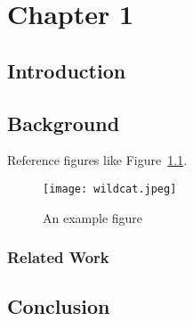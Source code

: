 
\chapter{Chapter 1} \label{chapter-1}

\section{Introduction}
\blindtext

\section{Background} \label{ch1-sec:background}
\blindtext

Reference figures like Figure~\ref{fig:wildcat}.
\begin{figure}%
	\centering
	\texttt{[image: wildcat.jpeg]} 
	\caption{An example figure} 
	\label{fig:wildcat} 
\end{figure}

\subsection{Related Work} \label{ch1-subsec:related-work}
\blindtext

\section{Conclusion} \label{ch1-sec:conclusion}
\blindtext

